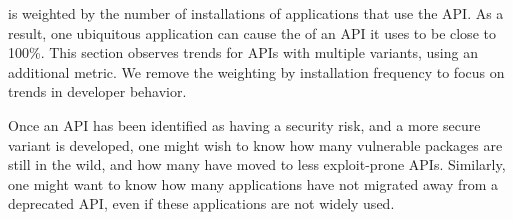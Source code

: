 \label{sec:syspop:security}

\Usagemetric{} is weighted by the number of installations
of applications that use the API.
As a result, one ubiquitous application can cause the \usagemetric{} of an API it uses to be close to 100\%.
This section observes trends for APIs with multiple variants, using an additional 
\unwusagemetric{} metric. 
We remove the weighting by installation frequency to focus on 
trends in developer behavior.



Once an API has been identified as having a security risk, and a more secure variant
is developed, one might wish to know how many 
vulnerable packages are still in the wild,
and how many have moved to less exploit-prone APIs.
Similarly, one might want to know how many applications have not migrated away from a deprecated API,
even if these applications are not widely used.



